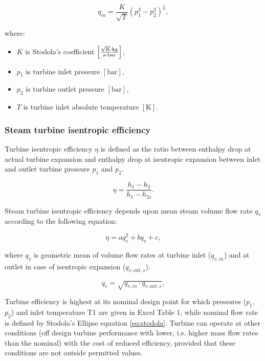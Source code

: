 \documentclass[openany]{book}
\begin{document}
	\begin{equation}\label{eq:stodola}
	q_m = \frac{K}{\sqrt{T}}(p_1^2 - p_2^2)^\frac{1}{2},
	\end{equation}
	
	\noindent
	where:
	
	\begin{itemize}
		\item $K$ is Stodola’s coefficient $\left[\frac{\sqrt{\textrm{K}}\cdot 
			\textrm{kg}}{\textrm{s} \cdot \textrm{\textrm{bar}}}\right]$, 
		\item $p_1$ is turbine inlet pressure $\left[\textrm{bar}\right]$,
		\item $p_2$ is turbine outlet pressure $\left[\textrm{bar}\right]$,
		\item $T$ is turbine inlet absolute temperature 
		$\left[\textrm{K}\right]$.
	\end{itemize}
	
	\subsubsection*{Steam turbine isentropic efficiency}
	
	Turbine isentropic efficiency $\eta$ is defined as the ratio between 
	enthalpy drop at actual turbine expansion and enthalpy drop at isentropic 
	expansion between inlet and outlet turbine pressure $p_1$ and $p_2$.
	
	\begin{equation}\label{eq:eta}
	\eta = \frac{h_1-h_2}{h_1 - h_{2s}}.
	\end{equation}
	
	Steam turbine isentropic efficiency depends upon mean steam volume flow 
	rate $q_v$ according to the following equation:
	
	\begin{equation}\label{eq:eta2}
	\eta = aq_v^2 + bq_v + c,
	\end{equation}
	
	\noindent
	where $q_v$ is geometric mean of volume flow rates at turbine inlet 
	($q_{v,in}$) and at outlet in case of isentropic expansion ($q_{v,out,s}$). 
	
	\begin{equation}\label{eq:q_v}
	q_v = \sqrt{q_{v,in} \cdot q_{v,out,s}},
	\end{equation}
	
	Turbine efficiency is highest at its nominal design point for which 
	pressures ($p_1$, $p_2$) and inlet temperature T1 are given in Excel Table 
	1, while nominal flow rate is defined by Stodola’s Ellipse equation 
	\ref{eq:stodola}. Turbine can operate at other conditions (off design 
	turbine performance with lower, i.e. higher mass flow rates than the 
	nominal) with the cost of reduced efficiency, provided that these 
	conditions are not outside permitted values.
	
\end{document}
